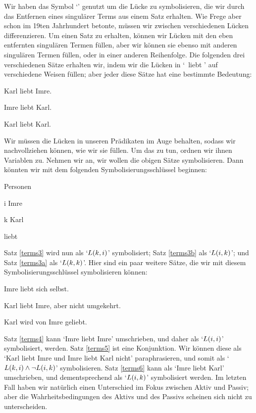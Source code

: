 Wir haben das Symbol `\blank' genutzt um die Lücke zu symbolisieren, die wir durch das Entfernen eines singulärer Terms aus einem Satz erhalten. Wie Frege aber schon im 19ten Jahrhundert betonte, müssen wir zwischen verschiedenen Lücken differenzieren. Um einen Satz zu erhalten, können wir Lücken mit den eben entfernten singulären Termen füllen, aber wir können sie ebenso mit anderen singulären Termen füllen, oder in einer anderen Reihenfolge. Die folgenden drei verschiedenen Sätze erhalten wir, indem wir die Lücken in `\blank\ liebt \blank{}' auf verschiedene Weisen füllen; aber jeder diese Sätze hat eine bestimmte Bedeutung:
\begin{earg}
	\item[\ex{terms3}] Karl liebt Imre.
	\item[\ex{terms3b}] Imre liebt Karl.
	\item[\ex{terms3a}] Karl liebt Karl.
\end{earg}
Wir müssen die Lücken in unseren Prädikaten im Auge behalten, sodass wir nachvollziehen können, wie wir sie füllen. Um das zu tun, ordnen wir ihnen Variablen zu. Nehmen wir an, wir wollen die obigen Sätze symbolisieren. Dann könnten wir mit dem folgenden Symbolisierungsschlüssel beginnen: 
	\begin{ekey}
		\item[\text{Domäne}] Personen
		\item[i] Imre
		\item[k] Karl
		\item[\atom{L}{x,y}]  liebt 
	\end{ekey}
Satz \ref{terms3} wird nun als `$\mathord{L}(k,i)$' symbolisiert; Satz \ref{terms3b} als `$\mathord{L}(i,k)$'; und Satz \ref{terms3a} als `$\mathord{L}(k,k)$'. Hier sind ein paar weitere Sätze, die wir mit diesem Symbolisierungsschlüssel symbolisieren können:
\begin{earg}
	\item[\ex{terms4}] Imre liebt sich selbst.
	\item[\ex{terms5}] Karl liebt Imre, aber nicht umgekehrt.
	\item[\ex{terms6}] Karl wird von Imre geliebt.
\end{earg}
Satz \ref{terms4} kann `Imre liebt Imre' umschrieben, und daher als `$\mathord{L}(i,i)$' symbolisiert, werden. Satz \ref{terms5} ist eine Konjunktion. Wir können diese als `Karl liebt Imre und Imre liebt Karl nicht' paraphrasieren, und somit als `$\mathord{L}(k,i) \wedge \neg \mathord{L}(i,k)$' symbolisieren. Satz \ref{terms6} kann als `Imre liebt Karl' umschrieben, und dementsprechend als `$\mathord{L}(i,k)$' symbolisiert werden. Im letzten Fall haben wir natürlich einen Unterschied im Fokus zwischen Aktiv und Passiv; aber die Wahrheitsbedingungen des Aktivs und des Passivs scheinen sich nicht zu unterscheiden.

